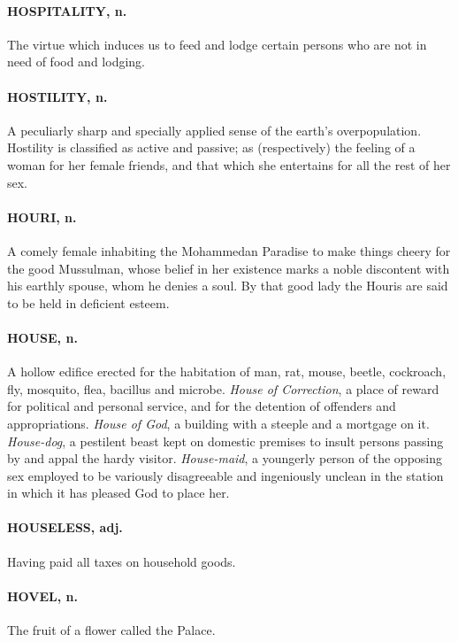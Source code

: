 \documentclass[11pt]{article}
\begin{document}
\paragraph{HOSPITALITY, n.}  The virtue which induces us to feed and lodge certain
persons who are not in need of food and lodging.

\paragraph{HOSTILITY, n.}  A peculiarly sharp and specially applied sense of the
earth's overpopulation.  Hostility is classified as active and
passive; as (respectively) the feeling of a woman for her female
friends, and that which she entertains for all the rest of her sex.

\paragraph{HOURI, n.}  A comely female inhabiting the Mohammedan Paradise to make
things cheery for the good Mussulman, whose belief in her existence
marks a noble discontent with his earthly spouse, whom he denies a
soul.  By that good lady the Houris are said to be held in deficient
esteem.

\paragraph{HOUSE, n.}  A hollow edifice erected for the habitation of man, rat,
mouse, beetle, cockroach, fly, mosquito, flea, bacillus and microbe.
{\em House of Correction}, a place of reward for political and personal
service, and for the detention of offenders and appropriations.
{\em House of God}, a building with a steeple and a mortgage on it.
{\em House-dog}, a pestilent beast kept on domestic premises to insult
persons passing by and appal the hardy visitor.  {\em House-maid}, a
youngerly person of the opposing sex employed to be variously
disagreeable and ingeniously unclean in the station in which it has
pleased God to place her.

\paragraph{HOUSELESS, adj.}  Having paid all taxes on household goods.

\paragraph{HOVEL, n.}  The fruit of a flower called the Palace.
\end{document}
